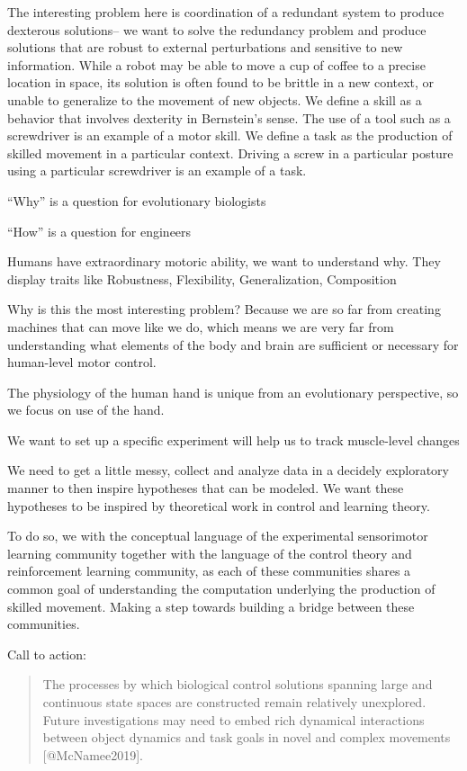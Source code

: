 \documentclass[../main.tex]{subfiles}
\begin{document}
The interesting problem here is coordination of a redundant system to produce dexterous solutions-- we want to solve the redundancy problem and produce solutions that are robust to external perturbations and sensitive to new information. While a robot may be able to move a cup of coffee to a precise location in space, its solution is often found to be brittle in a new context, or unable to generalize to the movement of new objects. We define a skill as a behavior that involves dexterity in Bernstein's sense. The use of a tool such as a screwdriver is an example of a motor skill. We define a task as the production of skilled movement in a particular context. Driving a screw in a particular posture using a particular screwdriver is an example of a task.

``Why'' is a question for evolutionary biologists

``How'' is a question for engineers

Humans have extraordinary motoric ability, we want to understand why. They display traits like Robustness, Flexibility, Generalization, Composition

Why is this the most interesting problem? Because we are so far from creating machines that can move like we do, which means we are very far from understanding what elements of the body and brain are sufficient or necessary for human-level motor control.

The physiology of the human hand is unique from an evolutionary perspective, so we focus on use of the hand.

We want to set up a specific experiment will help us to track muscle-level changes


We need to get a little messy, collect and analyze data in a decidely exploratory manner to then inspire hypotheses that can be modeled. We want these hypotheses to be inspired by theoretical work in control and learning theory.

To do so, we with the conceptual language of the experimental sensorimotor learning community together with the language of the control theory and reinforcement learning community, as each of these communities shares a common goal of understanding the computation underlying the production of skilled movement. Making a step towards building a bridge between these communities.

Call to action:

\begin{quote}
  The processes by which biological control solutions spanning large and continuous state spaces are constructed remain relatively unexplored. Future investigations may need to embed rich dynamical interactions between object dynamics and task goals in novel and complex movements [@McNamee2019].
\end{quote}
\end{document}
